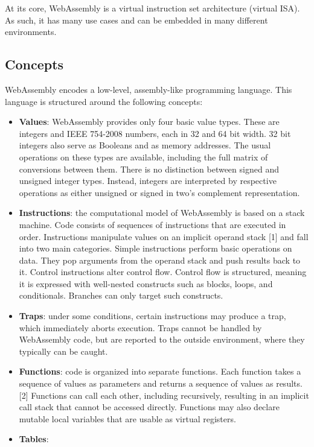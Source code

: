 At its core, WebAssembly is a virtual instruction set architecture (virtual ISA). As such, it has many use cases and can be embedded in many different environments.

\subsection{Concepts} \cite{wasm1}

WebAssembly encodes a low-level, assembly-like programming language. 
This language is structured around the following concepts:

\begin{itemize} 
  \item \textbf{Values}:
  WebAssembly provides only four basic value types. These are integers and IEEE 754-2008 numbers, each in 32 and 64 bit width. 32 bit integers also serve as Booleans and as memory addresses. The usual operations on these types are available, including the full matrix of conversions between them. There is no distinction between signed and unsigned integer types. Instead, integers are interpreted by respective operations as either unsigned or signed in two’s complement representation.
  \item \textbf{Instructions}:
  the computational model of WebAssembly is based on a stack machine. Code consists of sequences of instructions that are executed in order. Instructions manipulate values on an implicit operand stack [1] and fall into two main categories. Simple instructions perform basic operations on data. They pop arguments from the operand stack and push results back to it. Control instructions alter control flow. Control flow is structured, meaning it is expressed with well-nested constructs such as blocks, loops, and conditionals. Branches can only target such constructs.
  \item \textbf{Traps}:
  under some conditions, certain instructions may produce a trap, which immediately aborts execution. Traps cannot be handled by WebAssembly code, but are reported to the outside environment, where they typically can be caught.
  \item \textbf{Functions}:
  code is organized into separate functions. Each function takes a sequence of values as parameters and returns a sequence of values as results. [2] Functions can call each other, including recursively, resulting in an implicit call stack that cannot be accessed directly. Functions may also declare mutable local variables that are usable as virtual registers.
  \item \textbf{Tables}:

\end{itemize}
